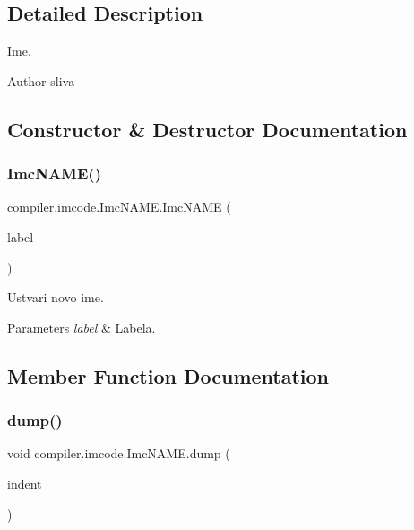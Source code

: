 \subsection{Detailed Description}
Ime.

\begin{DoxyAuthor}{Author}
sliva 
\end{DoxyAuthor}


\subsection{Constructor \& Destructor Documentation}
\mbox{\label{classcompiler_1_1imcode_1_1_imc_n_a_m_e_a86e0024212365d21856966cf44d314d0}} 
\subsubsection{\texorpdfstring{Imc\+N\+A\+M\+E()}{ImcNAME()}}
{\footnotesize\ttfamily compiler.\+imcode.\+Imc\+N\+A\+M\+E.\+Imc\+N\+A\+ME (\begin{DoxyParamCaption}\item[{\hyperlink{classcompiler_1_1frames_1_1_frm_label}{Frm\+Label}}]{label }\end{DoxyParamCaption})}

Ustvari novo ime.


\begin{DoxyParams}{Parameters}
{\em label} & Labela. \\
\hline
\end{DoxyParams}


\subsection{Member Function Documentation}
\mbox{\label{classcompiler_1_1imcode_1_1_imc_n_a_m_e_a3d2c4a326360dea3acbfa30611b66f9e}} 
\subsubsection{\texorpdfstring{dump()}{dump()}}
{\footnotesize\ttfamily void compiler.\+imcode.\+Imc\+N\+A\+M\+E.\+dump (\begin{DoxyParamCaption}\item[{int}]{indent }\end{DoxyParamCaption})}

